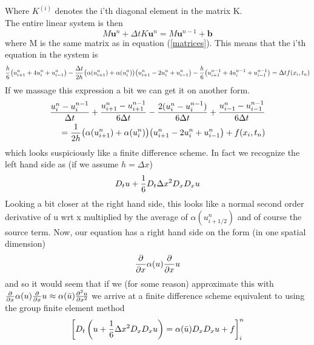 \documentclass[a4paper,english, 10pt, twoside]{article}
\renewcommand{\d}{\partial}
\begin{document}
Where $K^{(i)}$ denotes the i'th diagonal element in the matrix K.\\
The entire linear system is then
$$
M\mathbf{u}^n +\Delta tK\mathbf{u}^n = M\mathbf{u}^{n-1} +\mathbf{b}
$$
where M is the same matrix as in equation (\ref{matrices}). This means that the i'th equation in the system is
\begin{align*}
 {h\over6}\big(u^{n}_{i+1}+4u^{n}_{i} +u^{n}_{i-1}\big) -{\Delta t\over 2h}\big(\alpha(u^{n}_{i+1})+\alpha(u^{n}_{i})\big)\big(u^{n}_{i+1}
 -2u^{n}_{i} +u^{n}_{i-1}\big) -{h\over6}\big(u^{n-1}_{i+1}+4u^{n-1}_{i}+u^{n-1}_{i-1}\big) = \Delta tf(x_i,t_n)
\end{align*}
If we massage this expression a bit we can get it on another form.
\begin{align*}
 {u^{n}_{i}-u^{n-1}_{i}\over \Delta t} +{u^{n}_{i+1}-u^{n-1}_{i+1}\over 6\Delta t} -{2(u^{n}_{i}-u^{n-1}_{i})\over 6\Delta t} +
 {u^{n}_{i-1}-u^{n-1}_{i-1}\over6\Delta t} \\
 = {1\over 2h}\big(\alpha(u^{n}_{i+1})+\alpha(u^{n}_{i})\big)\big(u^{n}_{i+1}-2u^{n}_{i} +u^{n}_{i-1}\big) +f(x_i,t_n)
\end{align*}
which looks suspiciously like a finite difference scheme. In fact we recognize the left hand side as (if we assume $h = \Delta x$)
\begin{align*}
 D_tu +{1\over6}D_t\Delta x^2D_xD_xu
\end{align*}
Looking a bit closer at the right hand side, this looks like a normal second order derivative of u wrt x multiplied by the average of 
$\alpha(u^n_{i+1/2})$ and of course the source term. Now, our equation has a right hand side on the form (in one spatial dimension)
\begin{equation*}
 {\d \over\d x}\alpha(u){\d \over\d x}u
\end{equation*}
and so it would seem that if we (for some reason) approximate this with $ {\d \over\d x}\alpha(u){\d \over\d x}u \approx \alpha(\bar{u}) 
{\d^2 u\over \d x^2}$ we arrive at a finite difference scheme equivalent to using the group finite element method
\begin{align*}
 \left[D_t\left(u +{1\over6}\Delta x^2D_xD_xu\right)= \alpha(\bar{u})D_xD_xu +f\right]^n_i
 \end{align*}
\end{document}
